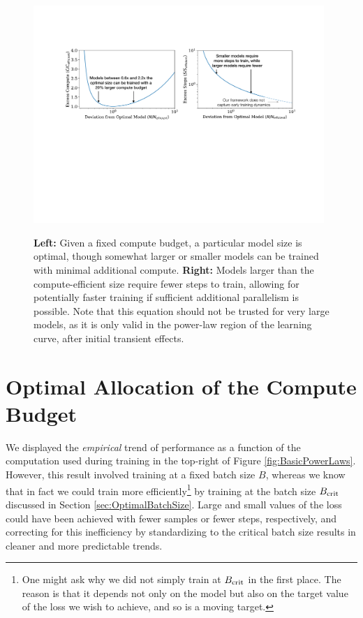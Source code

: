 \documentclass[english]{article}
\begin{document}
\begin{figure}
\noindent \centering{}
\includegraphics[width=0.98\textwidth]{SuboptimalModels}\
\caption[Training on suboptimal models]{\textbf{Left:} Given a fixed compute budget, a particular model size is optimal, though somewhat larger or smaller models can be trained with minimal additional compute. \textbf{Right:} Models larger than the compute-efficient size require fewer steps to train, allowing for potentially faster training if sufficient additional parallelism is possible. Note that this equation should not be trusted for very large models, as it is only valid in the power-law region of the learning curve, after initial transient effects.  \label{fig:SubOptimalModels}}
\end{figure}


\section{Optimal Allocation of the Compute Budget}
\label{sec:OptimalCompute}

We displayed the \emph{empirical} trend of performance as a function of the computation used during training in the top-right of Figure \ref{fig:BasicPowerLaws}.  However, this result involved training at a fixed batch size $B$, whereas we know that in fact we could train more efficiently\footnote{One might ask why we did not simply train at $B_{\rm crit}$ in the first place.  The reason is that it depends not only on the model but also on the target value of the loss we wish to achieve, and so is a moving target.} by training at the batch size $B_{\rm crit}$ discussed in Section \ref{sec:OptimalBatchSize}. Large and small values of the loss could have been achieved with fewer samples or fewer steps, respectively, and correcting for this inefficiency by standardizing to the critical batch size results in cleaner and more predictable trends.
\end{document}
